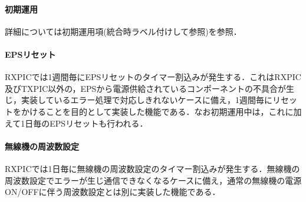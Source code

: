 \paragraph{初期運用}
詳細については初期運用項(統合時ラベル付けして参照)を参照．

\paragraph{EPSリセット}
RXPICでは1週間毎にEPSリセットのタイマー割込みが発生する．これはRXPIC及びTXPIC以外の，EPSから電源供給されているコンポーネントの不具合が生じ，実装しているエラー処理で対応しきれないケースに備え，1週間毎にリセットをかけることを目的として実装した機能である．なお初期運用中は，これに加えて1日毎のEPSリセットも行われる．

\paragraph{無線機の周波数設定}
RXPICでは1日毎に無線機の周波数設定のタイマー割込みが発生する．無線機の周波数設定でエラーが生じ通信できなくなるケースに備え，通常の無線機の電源ON/OFFに伴う周波数設定とは別に実装した機能である．

